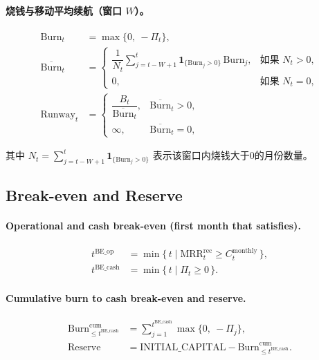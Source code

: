 \documentclass[11pt, a4paper, oneside]{article}
\begin{document}
\paragraph{烧钱与移动平均续航（窗口 $W$）。}
\begin{align}
\mathrm{Burn}_t &= \max\{0,\ -\Pi_t\},\\
\overline{\mathrm{Burn}}_t 
  &= 
  \begin{cases}
    \dfrac{1}{N_t} \sum_{j=t-W+1}^{t} \mathbf{1}_{\{\mathrm{Burn}_j>0\}}\, \mathrm{Burn}_j, & \text{如果 } N_t>0,\\[6pt]
    0, & \text{如果 } N_t=0,
  \end{cases}\\
\mathrm{Runway}_t 
  &= 
  \begin{cases}
    \dfrac{B_t}{\overline{\mathrm{Burn}}_t}, & \overline{\mathrm{Burn}}_t > 0,\\[6pt]
    \infty, & \overline{\mathrm{Burn}}_t = 0,
  \end{cases}
\end{align}



其中 $N_t=\sum_{j=t-W+1}^{t}\mathbf{1}_{\{\mathrm{Burn}_j>0\}}$ 表示该窗口内烧钱大于0的月份数量。

\subsection{Break-even and Reserve}
\paragraph{Operational and cash break-even (first month that satisfies).}
\begin{align}
t^{\mathrm{BE\_op}} 
  &= \min\{\, t \mid \mathrm{MRR}^{\mathrm{rec}}_t \ge C^{\mathrm{monthly}}_t \,\},\\
t^{\mathrm{BE\_cash}} 
  &= \min\{\, t \mid \Pi_t \ge 0 \,\}.
\end{align}

\paragraph{Cumulative burn to cash break-even and reserve.}
\begin{align}
\mathrm{Burn}^{\mathrm{cum}}_{\le t^{\mathrm{BE\_cash}}} 
  &= \sum_{j=1}^{t^{\mathrm{BE\_cash}}} \max\{0,\ -\Pi_j\},\\
\mathrm{Reserve}
  &= \text{INITIAL\_CAPITAL} - \mathrm{Burn}^{\mathrm{cum}}_{\le t^{\mathrm{BE\_cash}}}.
\end{align}
\end{document}
